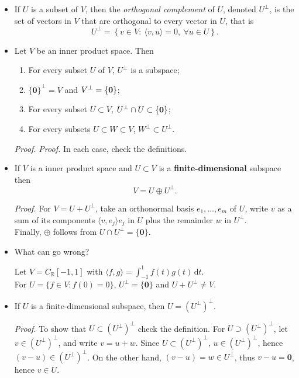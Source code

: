 \documentclass[11pt]{article}
\newcommand{\1}{\mathbf{1}}
\newcommand{\inner}[2]{\langle #1, #2 \rangle}
\newcommand{\dd}{{\mathrm{d}}}
\newcommand{\0}{\mathbf{0}}
\newcommand{\R}{\mathbb{R}}
\newcommand{\spitem}{\item[$\circ$]}
\begin{document}
{\begin{itemize}

\item

If $U$ is a subset of $V$, then the \emph{orthogonal complement} of $U$, denoted $U^{\perp}$, is the set of vectors in $V$ that are orthogonal to every vector in $U$, that is
\[
U^{\perp}=\left\{v\in V:\ \langle v,u\rangle=0, \ \forall u\in U\right\}.
\]


\item

Let $V$ be an inner product space. Then
\begin{enumerate}
\item For every subset $U$ of $V$, $U^\perp$ is a subspace;
\item $\{\0\}^\perp=V$ and $V^\perp=\{\bf{ 0}\}$;
\item For every subset $U\subset V$, $U^\perp\cap U\subset \{{\bf 0}\}$;
\item For every subsets $U\subset W\subset V$, $W^\perp\subset U^\perp$.
\end{enumerate}

\emph{Proof.}
\emph{Proof.}
In each case, check the definitions.

\item

If $V$ is a inner product space and $U\subset V$ is a \textbf{finite-dimensional} subspace then $$V=U\oplus U^\perp.$$

\emph{Proof.}
For $V=U+U^\perp$, take an orthonormal basis $e_1,\dots,e_m$ of $U$, write $v$ as a sum of its components $\inner{v}{e_j}e_j$ in $U$ plus the remainder $w$ in $U^\perp$.
\\
Finally, $\oplus$ follows from $U \cap U^\perp = \{\0\}$.

\spitem

What can go wrong?

Let $V = C_\R[-1,1]$ with $\inner{f}{g} = \int_{-1}^1 f(t)g(t) \,\dd t$.
\\
For $U = \{f \in V:f(0)=0\}$, $U^\perp = \{\0\}$ and $U+U^\perp \ne V$.

\item

If $U$ is a finite-dimensional subspace, then $U=(U^\perp)^\perp$.

\emph{Proof.}
 To show that $U \subset (U^\perp)^\perp$ check the definition.
For $U \supset (U^\perp)^\perp$, let $v\in (U^\perp)^\perp$, and write $v=u+w$.
Since $U \subset (U^\perp)^\perp$, $u \in (U^\perp)^\perp$, hence $(v-u) \in (U^\perp)^\perp$.
On the other hand, $(v-u) = w \in U^\perp$, thus $v-u=\0$, hence $v \in U$.


\end{itemize}}
\end{document}
